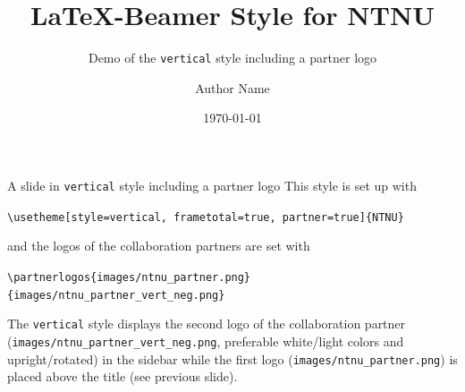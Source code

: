 \documentclass[aspectratio=169]{beamer}
\title{\LaTeX{}-Beamer Style for NTNU}
\subtitle{Demo of the  \texttt{vertical} style including a partner logo}
\author{Author Name}
\date{\today}
\begin{document}
	\maketitle
	\begin{frame}[fragile]{A slide in \texttt{vertical} style including a partner logo}
		This style is set up with

		\lstinline!\usetheme[style=vertical, frametotal=true, partner=true]{NTNU}!

		and the logos of the collaboration partners are set with

		\lstinline!\partnerlogos{images/ntnu_partner.png}{images/ntnu_partner_vert_neg.png}!

		The \texttt{vertical} style displays the second logo of the
		collaboration partner (\lstinline!images/ntnu_partner_vert_neg.png!,
		preferable white/light colors and upright/rotated) in the
		sidebar while the first logo (\lstinline!images/ntnu_partner.png!) is
		placed above the title (see previous slide).
	\end{frame}
\end{document}
